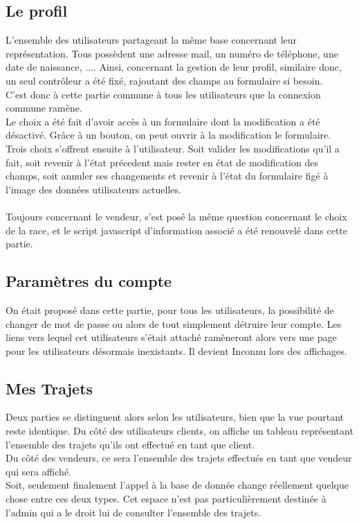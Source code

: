 \documentclass{article}
\begin{document}
\subsection{Le profil} 
L'ensemble des utilisateurs partageant la même base concernant leur représentation. Tous possèdent une adresse mail, un numéro de téléphone, une date de naissance, .... Ainsi, concernant la gestion de leur profil, similaire donc, un seul contrôleur a été fixé, rajoutant des champs au formulaire si besoin. 
\\  C'est donc à cette partie commune à tous les utilisateurs que la connexion commune ramène. 
\\
Le choix a été fait d'avoir accès à un formulaire dont la modification a été désactivé. Grâce à un bouton, on peut ouvrir à la modification le formulaire. \\
Trois choix s'offrent ensuite à l'utilisateur. Soit valider les modifications qu'il a fait, soit revenir à l'état précedent mais rester en état de modification des champs, soit annuler ses changements et revenir à l'état du formulaire figé à l'image des données utilisateurs actuelles. \\ \\
Toujours concernant le vendeur, s'est posé la même question concernant le choix de la race, et le script javascript d'information associé  a été renouvelé dans cette partie. 

\subsection{Paramètres du compte}
On était proposé dans cette partie, pour tous les utilisateurs, la possibilité de changer de mot de passe ou alors de tout simplement détruire leur compte. 
Les liens vers lequel cet utilisateurs s'était attaché ramèneront alors vers une page pour les utilisateurs désormais inexistants. Il devient Inconnu lors des affichages. 

\subsection{Mes Trajets}
Deux parties se distinguent alors selon les utilisateurs, bien que la vue pourtant reste identique. 
Du côté des utilisateurs clients, on affiche un tableau représentant l'ensemble des trajets qu'ils ont effectué en tant que client. 
\\
Du côté des vendeurs, ce sera l'ensemble des trajets effectués en tant que vendeur qui sera affiché. 
\\ 
Soit, seulement finalement l'appel à la base de donnée change réellement quelque chose entre ces deux types. 
Cet espace n'est pas particulièrement destinée à l'admin qui a le droit lui de consulter l'ensemble des trajets. 
\end{document}
